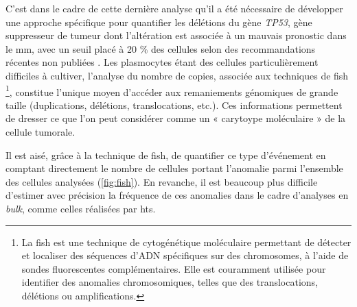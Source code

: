 \vspace{1em}

C'est dans le cadre de cette dernière analyse qu'il a été nécessaire de
développer une approche spécifique pour quantifier les délétions du gène
\textit{TP53}, gène suppresseur de tumeur dont l'altération est associée à un
mauvais pronostic dans le \gls{mm}, avec un seuil placé à 20 \% des cellules
selon des recommandations récentes non publiées
\cite{flyntPrognosisBiologyTargeting2020}. Les plasmocytes étant des cellules
particulièrement difficiles à cultiver, l'analyse du nombre de copies, associée
aux techniques de \gls{fish} \footnote{La \gls{fish} est une technique de
cytogénétique moléculaire permettant de détecter et localiser des séquences
d'ADN spécifiques sur des chromosomes, à l'aide de sondes fluorescentes
complémentaires. Elle est couramment utilisée pour identifier des anomalies
chromosomiques, telles que des translocations, délétions ou amplifications.},
constitue l'unique moyen d'accéder aux remaniements génomiques de grande taille
(duplications, délétions, translocations, etc.). Ces informations permettent de
dresser ce que l'on peut considérer comme un « carytoype moléculaire » de la
cellule tumorale.

\vspace{1em}

Il est aisé, grâce à la technique de \gls{fish}, de quantifier ce type
d'événement en comptant directement le nombre de cellules portant l'anomalie
parmi l'ensemble des cellules analysées (\autoref{fig:fish}). En revanche, il
est beaucoup plus difficile d'estimer avec précision la fréquence de ces
anomalies dans le cadre d'analyses en \textit{bulk}, comme celles réalisées par
\gls{hts}.

